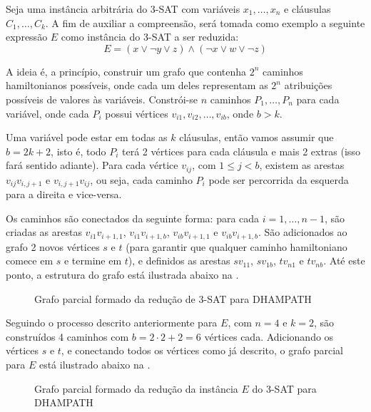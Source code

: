 Seja uma instância arbitrária do 3-SAT com variáveis $x_1,\ldots,x_n$ e cláusulas $C_1,\ldots,C_k$. A fim de auxiliar a compreensão, será tomada como exemplo a seguinte expressão $E$ como instância do 3-SAT a ser reduzida: $$E=(x\lor\lnot y\lor z)\land(\lnot x\lor w\lor\lnot z)$$

A ideia é, a princípio, construir um grafo que contenha $2^n$ caminhos hamiltonianos possíveis, onde cada um deles representam as $2^n$ atribuições possíveis de valores às variáveis. Constrói-se $n$ caminhos $P_1, \ldots, P_n$ para cada variável, onde cada $P_i$ possui vértices $v_{i1}, v_{i2}, \ldots,v_{ib}$, onde $b>k$.

Uma variável pode estar em todas as $k$ cláusulas, então vamos assumir que $b=2k+2$, isto é, todo $P_i$ terá 2 vértices para cada cláusula e mais 2 extras (isso fará sentido adiante). Para cada vértice $v_{ij}$, com $1 \le j < b$, existem as arestas $v_{ij}v_{i,j+1}$ e $v_{i,j+1}v_{ij}$, ou seja, cada caminho $P_i$ pode ser percorrida da esquerda para a direita e vice-versa.

Os caminhos são conectados da seguinte forma: para cada $i=1,\ldots, n-1$, são criadas as arestas $v_{i1}v_{i+1,1}$, $v_{i1}v_{i+1,b}$, $v_{ib}v_{i+1,1}$ e $v_{ib}v_{i+1,b}$. São adicionados ao grafo 2 novos vértices $s$ e $t$ (para garantir que qualquer caminho hamiltoniano comece em $s$ e termine em $t$), e definidos as arestas $sv_{11}$, $sv_{1b}$, $tv_{n1}$ e $tv_{nb}$. Até este ponto, a estrutura do grafo está ilustrada abaixo na .

\begin{figure}[H]
    \centering
    
    \caption{Grafo parcial formado da redução de 3-SAT para DHAMPATH}
    \label{fig:3-sat-para-chd_parcial}
\end{figure}

Seguindo o processo descrito anteriormente para $E$, com $n=4$ e $k=2$, são construídos 4 caminhos com $b=2\cdot2+2=6$ vértices cada. Adicionando os vértices $s$ e $t$, e conectando todos os vértices como já descrito, o grafo parcial para $E$ está ilustrado abaixo na .

\begin{figure}[H]
    \centering
    
    \caption{Grafo parcial formado da redução da instância $E$ do 3-SAT para DHAMPATH}
    \label{fig:3-sat-para-chd_parcial_exemplo}
\end{figure}

